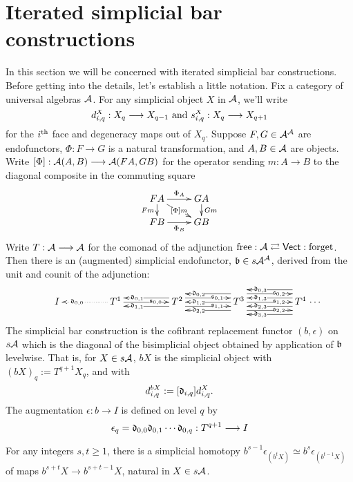 \documentclass[11pt]{amsart}
\theoremstyle{plain}
\begin{document}
\appendix
\section{Iterated simplicial bar constructions}\label{sec:ItSimpBar}
\newcommand{\algCat}{\calA}
\newcommand{\trip}[3]{{#1}_{\smash{#2}}^{\smash{#3}}}
In this section we will be concerned with iterated simplicial bar constructions. Before getting into the details, let's establish a little notation. Fix a category of universal algebras $\algCat$. For any simplicial object $X$ in $\algCat$, we'll write 
\[\trip{d}{i,q}{X}:X_q\to X_{q-1}\textup{\ and\ }\trip{s}{i,q}{X}:X_q\to X_{q+1}\]
for the $i^\textup{th}$ face and degeneracy maps out of $X_q$. Suppose $F,G\in\algCat^\algCat$ are endofunctors, $\Phi:F\to G$ is a natural transformation, and $A,B\in\algCat$ are objects. Write $[\Phi]:\algCat(A,B)\to\algCat(FA,GB)$ for the operator sending $m:A\to B$ to the diagonal composite in the commuting square
\[\xymatrix@R=4mm{
FA
\ar[r]^-{\Phi_A}
\ar[d]_-{Fm}
\ar[dr]|-{[\Phi]m}
&%
GA
\ar[d]^-{Gm}
\\%
FB
\ar[r]_-{\Phi_B}
&%
GB
}\]
Write $T:\algCat\to \algCat$ for the comonad of the adjunction $\textup{free}:\algCat\rightleftarrows\mathsf{Vect}:\textup{forget}$. Then there is an (augmented) simplicial endofunctor, $\frakb\in s\algCat^\algCat$, derived from the unit and counit of the adjunction:
\[\vcenter{
\def\labelstyle{\scriptstyle}
\xymatrix@C=1.65cm@1{
{\ I\,}
&
\,T^1\,
\ar@{..>}[l]|(.65){\frakd_{0,0}}
\ar[r]|(.65){\fraks_{0,0}}
&
\,T^2\,
\ar@<-1ex>[l]|(.65){\frakd_{0,1}}
\ar@<+1ex>[l]|(.65){\frakd_{1,1}}
\ar@<+1ex>[r]|(.65){\fraks_{0,1}}
\ar@<-1ex>[r]|(.65){\fraks_{1,1}}
&
\,T^3\,
\ar[l]|(.65){\frakd_{1,2}}
\ar@<-2ex>[l]|(.65){\frakd_{0,2}}
\ar@<+2ex>[l]|(.65){\frakd_{2,2}}
\ar[r]|(.65){\fraks_{1,2}}
\ar@<+2ex>[r]|(.65){\fraks_{0,2}}
\ar@<-2ex>[r]|(.65){\fraks_{2,2}}
&
\,T^4\,\makebox[0cm][l]{\,$\cdots $}
\ar@<-3ex>[l]|(.65){\frakd_{0,3}}
\ar@<-1ex>[l]|(.65){\frakd_{1,3}}
\ar@<+1ex>[l]|(.65){\frakd_{2,3}}
\ar@<+3ex>[l]|(.65){\frakd_{3,3}}
}}\]
The simplicial bar construction is the cofibrant replacement functor $(b,\epsilon)$ on $s\algCat$ which is the diagonal of the bisimplicial object obtained by application of $\mathfrak{b}$ levelwise. That is, for $X\in s\algCat$, $bX$ is the simplicial object with $(bX)_q:=T^{q+1}X_q$, and with
\[\trip{d}{i,q}{bX}:=[\frakd_{i,q}]\trip{d}{i,q}{X}.\]
The augmentation $\epsilon:b\to I$ is defined on level $q$ by 
\[\epsilon_q=\mathfrak{d}_{0,0}\mathfrak{d}_{0,1}\cdots \mathfrak{d}_{0,q}:T^{q+1}\longrightarrow I\]
\begin{prop}\label{IteratedBarConstructionHomotopy}
For any integers $s,t\geq1$, there is a simplicial homotopy $b^{s-1}\epsilon_{(b^{t}X)}\simeq b^{s}\epsilon_{(b^{t-1}X)}$ of maps $b^{s+t}X\to b^{s+t-1}X$, natural in $X\in s\algCat$.
\end{prop}
\end{document}
